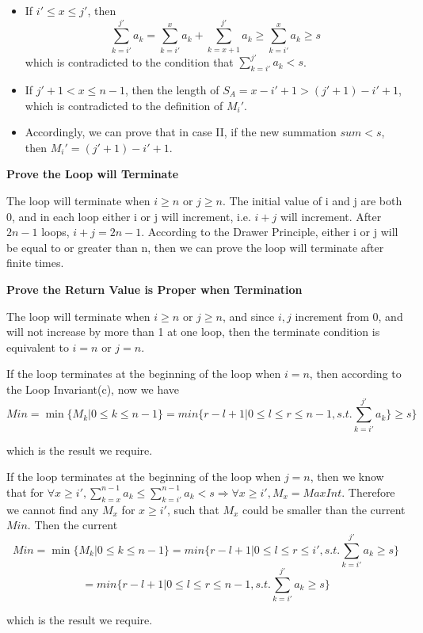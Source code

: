 \documentclass[12pt]{article}
\newenvironment{solution}[2][Solution]{\begin{trivlist}
\item[\hskip \labelsep {\bfseries #1}]}{\end{trivlist}}
\begin{document}
\begin{solution}{}
\begin{itemize}
        \item[] If $i'\leq x\leq j'$, then
        \[\sum_{k=i'}^{j'}{a_k}=\sum_{k=i'}^{x}{a_k}+\sum_{k=x+1}^{j'}{a_k}\geq \sum_{k=i'}^{x}{a_k}\geq s\]
        which is contradicted to the condition that $\sum_{k=i'}^{j'}{a_k}<s$.
        \item[] If $j'+1<x\leq n-1$, then the length of $S_A=x-i'+1>(j'+1)-i'+1$, which is contradicted to the definition of $M_i'$.
        \item[] Accordingly, we can prove that in case II, if the new summation $sum<s$, then $M_i'=(j'+1)-i'+1$.
    \end{itemize}
    \item[(V)] \textbf{Prove the Loop will Terminate}
    \item[] The loop will terminate when $i\geq n$ or $j\geq n$. The initial value of i and j are both 0, and in each loop either i or j will increment, i.e. $i+j$ will increment. After $2n-1$ loops, $i+j=2n-1$. According to the Drawer Principle, either i or j will be equal to or greater than n, then we can prove the loop will terminate after finite times.
    \item[(VI)] \textbf{Prove the Return Value is Proper when Termination}
    \item[] The loop will terminate when $i\geq n$ or $j\geq n$, and since $i,j$ increment from 0, and will not increase by more than 1 at one loop, then the terminate condition is equivalent to $i=n$ or $j=n$.
    \item[] If the loop terminates at the beginning of the loop when $i=n$, then according to the Loop Invariant(c), now we have
    \[Min=\min\{M_k|0\leq k\leq n-1\}=min\{r-l+1|0\leq l\leq r\leq n-1, s.t. \sum_{k=i'}^{j'}{a_k}\}\geq s\}\]
    \item[] which is the result we require.
    \item[] If the loop terminates at the beginning of the loop when $j=n$, then we know that for $\forall x\geq i', \sum_{k=x}^{n-1}{a_k}\leq \sum_{k=i'}^{n-1}{a_k}<s\Rightarrow \forall x\geq i', M_x=MaxInt.$ Therefore we cannot find any $M_x$ for $x\geq i'$, such that $M_x$ could be smaller than the current $Min$. Then the current
    \[Min=\min\{M_k|0\leq k\leq n-1\}=min\{r-l+1|0\leq l\leq r\leq i', s.t. \sum_{k=i'}^{j'}{a_k}\geq s\}\]
    \[=min\{r-l+1|0\leq l\leq r\leq n-1, s.t. \sum_{k=i'}^{j'}{a_k}\geq s\}\]
    \item[] which is the result we require.
\end{solution}


\pagebreak
\end{document}
